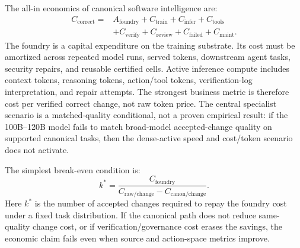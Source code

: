 The all-in economics of canonical software intelligence are:
\begin{equation}
\begin{split}
 C_{\text{correct}} ={}&
 A_{\text{foundry}} + C_{\text{train}} + C_{\text{infer}} +
 C_{\text{tools}} \\
&+ C_{\text{verify}} + C_{\text{review}} +
 C_{\text{failed}} + C_{\text{maint}}.
\end{split}
\end{equation}
The foundry is a capital expenditure on the training substrate. Its cost must be amortized across repeated model runs, served tokens, downstream agent tasks, security repairs, and reusable certified cells. Active inference compute includes context tokens, reasoning tokens, action/tool tokens, verification-log interpretation, and repair attempts. The strongest business metric is therefore cost per verified correct change, not raw token price. The central specialist scenario is a matched-quality conditional, not a proven empirical result: if the 100B--120B model fails to match broad-model accepted-change quality on supported canonical tasks, then the dense-active speed and cost/token scenario does not activate.

The simplest break-even condition is:
\begin{equation}
k^*=\frac{C_{\mathrm{foundry}}}{C_{\mathrm{raw/change}}-C_{\mathrm{canon/change}}}.
\end{equation}
Here $k^*$ is the number of accepted changes required to repay the foundry cost under a fixed task distribution. If the canonical path does not reduce same-quality change cost, or if verification/governance cost erases the savings, the economic claim fails even when source and action-space metrics improve.

